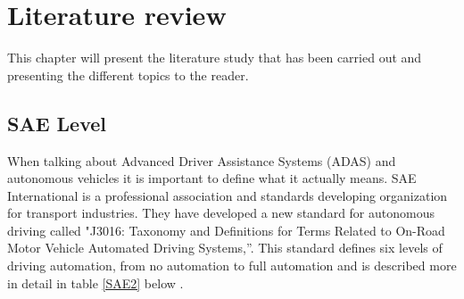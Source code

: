 \chapter{Literature review}
This chapter will present the literature study that has been carried out and presenting the different topics to the reader.



\section{SAE Level}
When talking about Advanced Driver Assistance Systems (ADAS) and autonomous vehicles it is important to define what it actually means. SAE International is a professional association and standards developing organization for transport industries. They have developed a new standard for autonomous driving called  "J3016: Taxonomy and Definitions for Terms Related to On-Road Motor Vehicle Automated Driving Systems,”. This standard defines six levels of driving automation, from no automation to full automation and is described more in detail in table \ref{SAE2} below \cite{SAE} \cite{SAEweb}. 


